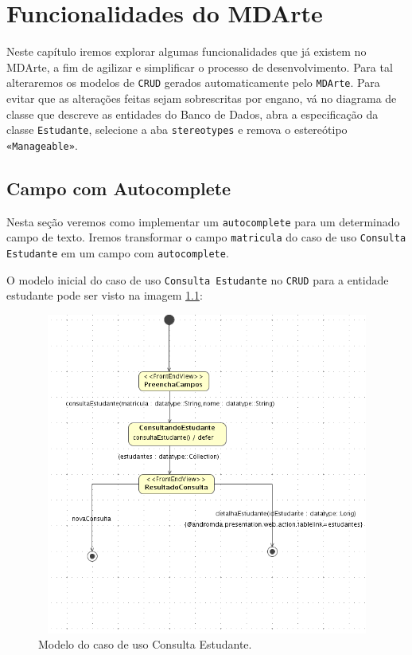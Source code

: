 \chapter{Funcionalidades do MDArte}
Neste capítulo iremos explorar algumas funcionalidades que já existem no MDArte,
a fim de agilizar e simplificar o processo de desenvolvimento. Para tal
alteraremos os modelos de \texttt{CRUD} gerados automaticamente pelo
\texttt{MDArte}. Para evitar que as alterações feitas sejam sobrescritas por
engano, vá no diagrama de classe que descreve as entidades do Banco de Dados,
abra a especificação da classe \texttt{Estudante}, selecione a aba
\texttt{stereotypes} e remova o estereótipo \texttt{«Manageable»}.

\section{Campo com Autocomplete}
Nesta seção veremos como implementar um \texttt{autocomplete} para um
determinado campo de texto. Iremos transformar o campo \texttt{matricula} do
caso de uso \texttt{Consulta Estudante} em um campo com \texttt{autocomplete}.

O modelo inicial do caso de uso \texttt{Consulta Estudante} no  \texttt{CRUD}
para a entidade estudante pode ser visto na imagem \ref{modelo_consulta_estudante}:
\begin{figure}[H]
	\centering
	\includegraphics[width=350pt,height=300pt]{imgs/tutorial-mdarte-0028.png}
	\caption{Modelo do caso de uso Consulta Estudante.}
	\label{modelo_consulta_estudante}
\end{figure}


